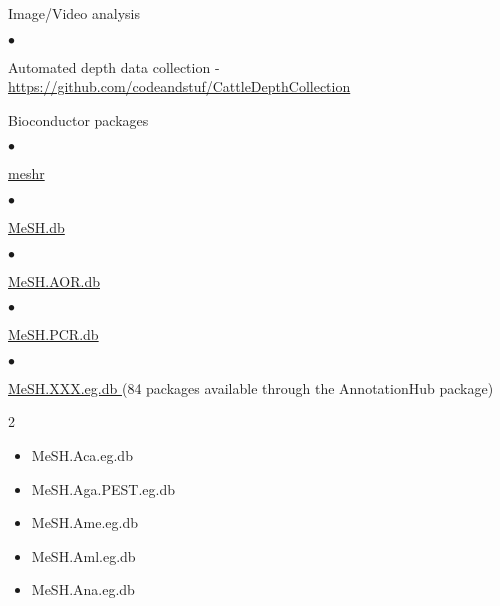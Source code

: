 \documentclass[margin,line,10pt]{res}
\newenvironment{list1}{
  \begin{list}{\ding{113}}{%
      \setlength{\itemsep}{0in}
      \setlength{\parsep}{0in} \setlength{\parskip}{0in}
      \setlength{\topsep}{0in} \setlength{\partopsep}{0in} 
      \setlength{\leftmargin}{0.17in}}}{\end{list}}
\newenvironment{list2}{
  \begin{list}{$\bullet$}{%
      \setlength{\itemsep}{0in}
      \setlength{\parsep}{0in} \setlength{\parskip}{0in}
      \setlength{\topsep}{0in} \setlength{\partopsep}{0in} 
      \setlength{\leftmargin}{0.2in}}}{\end{list}}
\begin{document}
\begin{resume}
\begin{list1}
\vspace{0.3cm}
\item[] Image/Video analysis
  \begin{list2}
  \item Automated depth data collection - \textcolor{blue}{\href{https://github.com/codeandstuf/CattleDepthCollection}{https://github.com/codeandstuf/CattleDepthCollection}}
\end{list2}


\vspace{0.3cm}
\item[] Bioconductor packages
\begin{list2}
\item \textcolor{blue}{\href{http://bioconductor.org/packages/release/bioc/html/meshr.html}{meshr}}
\end{list2}
\vspace{0.3cm}
\begin{list2}
\item  \textcolor{blue}{\href{http://bioconductor.org/packages/release/data/annotation/html/MeSH.db.html}{MeSH.db}}
\end{list2}
\vspace{0.3cm}
\begin{list2}
\item \textcolor{blue}{\href{http://www.bioconductor.org/packages/release/data/annotation/html/MeSH.AOR.db.html}{MeSH.AOR.db}}
\end{list2}
\vspace{0.3cm}
\begin{list2}
\item \textcolor{blue}{\href{http://www.bioconductor.org/packages/release/data/annotation/html/MeSH.PCR.db.html}{MeSH.PCR.db}}
\end{list2}
\vspace{0.3cm}
\begin{list2}
\item \textcolor{blue}{\href{http://www.bioconductor.org/packages/release/data/annotation/}{MeSH.XXX.eg.db }} (84 packages available through the AnnotationHub package)
\end{list2}
\begin{multicols}{2}
\begin{itemize}
\item MeSH.Aca.eg.db
\item MeSH.Aga.PEST.eg.db
\item MeSH.Ame.eg.db
\item MeSH.Aml.eg.db
\item MeSH.Ana.eg.db

\end{itemize}
\end{multicols}
\end{list1}
\end{resume}
\end{document}
